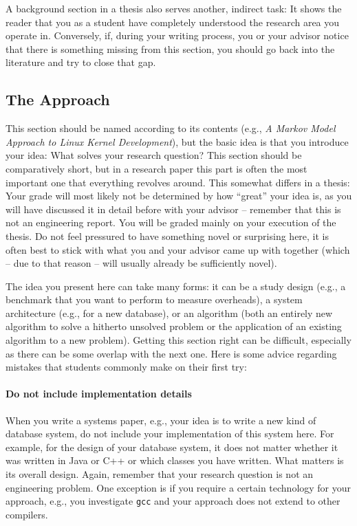 \documentclass[a4paper]{article}
\begin{document}
A background section in a thesis also serves another, indirect task:
It shows the reader that you as a student have completely understood the research area you operate in.
Conversely, if, during your writing process, you or your advisor notice that there is something missing from this section, you should go back into the literature and try to close that gap.

\subsection{The Approach}

This section should be named according to its contents (e.g., \emph{A Markov Model Approach to Linux Kernel Development}), but the basic idea is that you introduce your idea: What solves your research question?
This section should be comparatively short, but in a research paper this part is often the most important one that everything revolves around.
This somewhat differs in a thesis: Your grade will most likely not be determined by how ``great'' your idea is, as you will have discussed it in detail before with your advisor -- remember that this is not an engineering report.
You will be graded mainly on your execution of the thesis.
Do not feel pressured to have something novel or surprising here, it is often best to stick with what you and your advisor came up with together (which -- due to that reason -- will usually already be sufficiently novel).

The idea you present here can take many forms: it can be a study design (e.g., a benchmark that you want to perform to measure overheads), a system architecture (e.g., for a new database), or an algorithm (both an entirely new algorithm to solve a hitherto unsolved problem or the application of an existing algorithm to a new problem).
Getting this section right can be difficult, especially as there can be some overlap with the next one.
Here is some advice regarding mistakes that students commonly make on their first try:

\paragraph{Do not include implementation details}
When you write a systems paper, e.g., your idea is to write a new kind of database system, do not include your implementation of this system here.
For example, for the design of your database system, it does not matter whether it was written in Java or C++ or which classes you have written.
What matters is its overall design.
Again, remember that your research question is not an engineering problem.
One exception is if you require a certain technology for your approach, e.g., you investigate \texttt{gcc} and your approach does not extend to other compilers.
\end{document}
